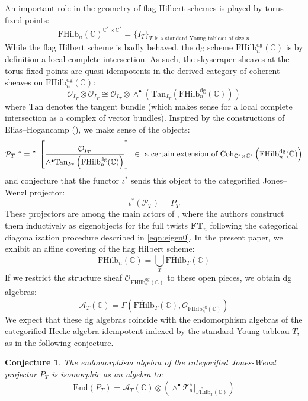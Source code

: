 \documentclass[12pt]{amsart}
\numberwithin{equation}{section}
\newtheorem{conjecture}[theorem]{Conjecture}
\theoremstyle{definition}
\theoremstyle{remark}
\DeclareMathOperator{\HHH}{HHH}
\newcommand{\CC}{\mathbb{C}}
\newcommand{\CA}{\mathcal{A}}
\newcommand{\CO}{\mathcal{O}}
\newcommand{\CP}{\mathcal{P}}
\newcommand{\CT}{\mathcal{T}}
\newcommand{\FT}{\mathbf{FT}}
\renewcommand{\1}{\mathbf{1}}
\newcommand{\coh}{\mathrm{Coh}}
\newcommand{\End}{\mathrm{End}}
\newcommand{\FH}{\mathrm{FHilb}}
\newcommand{\oFH}{\mathring{\FH}}
\newcommand{\torus}{\CC^{*} \times \CC^*}
\newcommand{\dg}{\text{dg}}%
\begin{document}
\subsection{} An important role in the geometry of flag Hilbert schemes is played by torus fixed points:
$$
\FH_n(\CC)^{\torus} = \{ I_T \}_{T \text{ is a standard Young tableau of size }n}
$$
While the flag Hilbert scheme is badly behaved, the dg scheme $\FH_n^\dg(\CC)$ is by definition a local complete intersection. As such, the skyscraper sheaves at the torus fixed points are quasi-idempotents in the derived category of coherent sheaves on $\FH_n^\dg(\CC)$:
$$
\CO_{I_T} \otimes \CO_{I_T}\cong  \CO_{I_T} \otimes \wedge^\bullet \left( \text{Tan}_{I_T} \left(\FH_n^\dg(\CC) \right) \right)
$$
where $\text{Tan}$ denotes the tangent bundle (which makes sense for a local complete intersection as a complex of vector bundles). Inspired by the constructions of Elias--Hogancamp (\cite{EH}), we make sense of the objects:
$$
\CP_T \ ``=" \ \left[ \frac {\CO_{I_T}}{\wedge^\bullet \text{Tan}_{I_T} \left( \FH_n^\dg(\CC) \right)} \right] \ \in \ \text{a certain extension of }\coh_{\torus} \left(\FH_n^\dg(\CC) \right)
$$
and conjecture that the functor $\iota^*$ sends this object to the categorified Jones--Wenzl projector:
\begin{equation}
\iota^*\left(\CP_T\right) = P_{T} 
\end{equation}
These projectors are among the main actors of \cite{EH}, where the authors construct them inductively as eigenobjects for the full twists $\FT_n$ following the categorical diagonalization procedure described in \eqref{eqn:eigen0}. In the present paper, we exhibit an affine covering of the flag Hilbert scheme:
$$
\FH_n(\CC) = \bigcup_T \oFH_T(\CC)
$$
If we restrict the structure sheaf $\CO_{\FH_n^\dg(\CC)}$ to these open pieces, we obtain dg algebras:
$$
\CA_T(\CC) = \Gamma \left(\oFH_T(\CC), \CO_{\FH_n^\dg(\CC)} \right)
$$ 
We expect that these dg algebras %
coincide with the endomorphism algebras of the categorified Hecke algebra idempotent indexed by the standard Young tableau $T$, as in the following conjecture.

\begin{conjecture}
\label{conj:homfly}
The %
endomorphism algebra of the categorified Jones-Wenzl projector $P_{T}$ is isomorphic as an algebra to:
\begin{equation}
\label{eqn:homfly}
\End(P_{T}) =  \CA_T(\CC) \otimes \left( \wedge^{\bullet}\CT_n^{\vee}|_{\oFH_T(\CC)} \right)
\end{equation}
\end{conjecture}
\end{document}

